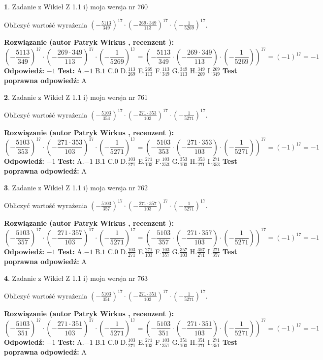 \documentclass[12pt, a4paper]{article}
\theoremstyle{definition} %
\newtheorem{zad}{}
\newcommand{\zadStart}[1]{\begin{zad}#1\newline}
\newcommand{\zadStop}{\end{zad}}
\newcommand{\rozwStart}[2]{\noindent \textbf{Rozwiązanie (autor #1 , recenzent #2): }\newline}
\newcommand{\rozwStop}{\newline}
\newcommand{\odpStart}{\noindent \textbf{Odpowiedź:}\newline}
\newcommand{\odpStop}{\newline}
\newcommand{\testStart}{\noindent \textbf{Test:}\newline}
\newcommand{\testStop}{\newline}
\newcommand{\kluczStart}{\noindent \textbf{Test poprawna odpowiedź:}\newline}
\newcommand{\kluczStop}{\newline}
\begin{document}
\zadStart{Zadanie z Wikieł Z 1.1 i) moja wersja nr 760}

Obliczyć wartość wyrażenia $(-\frac{5113}{349})^{17} \cdot (-\frac{269 \cdot 349}{113})^{17} \cdot (-\frac{1}{5269})^{17}$.
\zadStop
\rozwStart{Patryk Wirkus}{}
$$(-\frac{5113}{349})^{17} \cdot (-\frac{269 \cdot 349}{113})^{17} \cdot (-\frac{1}{5269})^{17} = (-\frac{5113}{349} \cdot (-\frac{269 \cdot 349}{113}) \cdot (-\frac{1}{5269}))^{17} = (-1)^{17} = -1$$
\rozwStop
\odpStart
$-1$
\odpStop
\testStart
A.$-1$ B.$1$ C.$0$ D.$\frac{113}{269}$ E.$\frac{269}{113}$
F.$\frac{113}{349}$ G.$\frac{349}{113}$
H.$\frac{349}{269}$
I.$\frac{269}{349}$
\testStop
\kluczStart
A
\kluczStop



\zadStart{Zadanie z Wikieł Z 1.1 i) moja wersja nr 761}

Obliczyć wartość wyrażenia $(-\frac{5103}{353})^{17} \cdot (-\frac{271 \cdot 353}{103})^{17} \cdot (-\frac{1}{5271})^{17}$.
\zadStop
\rozwStart{Patryk Wirkus}{}
$$(-\frac{5103}{353})^{17} \cdot (-\frac{271 \cdot 353}{103})^{17} \cdot (-\frac{1}{5271})^{17} = (-\frac{5103}{353} \cdot (-\frac{271 \cdot 353}{103}) \cdot (-\frac{1}{5271}))^{17} = (-1)^{17} = -1$$
\rozwStop
\odpStart
$-1$
\odpStop
\testStart
A.$-1$ B.$1$ C.$0$ D.$\frac{103}{271}$ E.$\frac{271}{103}$
F.$\frac{103}{353}$ G.$\frac{353}{103}$
H.$\frac{353}{271}$
I.$\frac{271}{353}$
\testStop
\kluczStart
A
\kluczStop



\zadStart{Zadanie z Wikieł Z 1.1 i) moja wersja nr 762}

Obliczyć wartość wyrażenia $(-\frac{5103}{357})^{17} \cdot (-\frac{271 \cdot 357}{103})^{17} \cdot (-\frac{1}{5271})^{17}$.
\zadStop
\rozwStart{Patryk Wirkus}{}
$$(-\frac{5103}{357})^{17} \cdot (-\frac{271 \cdot 357}{103})^{17} \cdot (-\frac{1}{5271})^{17} = (-\frac{5103}{357} \cdot (-\frac{271 \cdot 357}{103}) \cdot (-\frac{1}{5271}))^{17} = (-1)^{17} = -1$$
\rozwStop
\odpStart
$-1$
\odpStop
\testStart
A.$-1$ B.$1$ C.$0$ D.$\frac{103}{271}$ E.$\frac{271}{103}$
F.$\frac{103}{357}$ G.$\frac{357}{103}$
H.$\frac{357}{271}$
I.$\frac{271}{357}$
\testStop
\kluczStart
A
\kluczStop



\zadStart{Zadanie z Wikieł Z 1.1 i) moja wersja nr 763}

Obliczyć wartość wyrażenia $(-\frac{5103}{351})^{17} \cdot (-\frac{271 \cdot 351}{103})^{17} \cdot (-\frac{1}{5271})^{17}$.
\zadStop
\rozwStart{Patryk Wirkus}{}
$$(-\frac{5103}{351})^{17} \cdot (-\frac{271 \cdot 351}{103})^{17} \cdot (-\frac{1}{5271})^{17} = (-\frac{5103}{351} \cdot (-\frac{271 \cdot 351}{103}) \cdot (-\frac{1}{5271}))^{17} = (-1)^{17} = -1$$
\rozwStop
\odpStart
$-1$
\odpStop
\testStart
A.$-1$ B.$1$ C.$0$ D.$\frac{103}{271}$ E.$\frac{271}{103}$
F.$\frac{103}{351}$ G.$\frac{351}{103}$
H.$\frac{351}{271}$
I.$\frac{271}{351}$
\testStop
\kluczStart
A
\kluczStop
\end{document}

